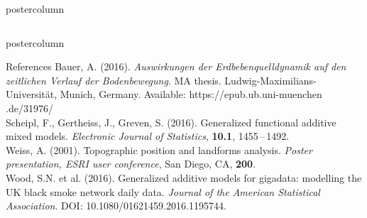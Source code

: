 \documentclass[final,hyperref={pdfpagelabels=false}]{beamer}
\begin{document}
\begin{frame}
\begin{columns}
\begin{column}{1\textwidth}
\begin{columns}[T]
\begin{column}{.484\textwidth}
\begin{beamercolorbox}[center,wd=\textwidth]{postercolumn}
\begin{minipage}[T]{.95\textwidth}
\end{minipage}
\end{beamercolorbox}
\end{column}

\begin{column}{.016\textwidth}
\end{column}

\end{columns}


\vspace{2ex}
\begin{beamercolorbox}[center,wd=\textwidth]{postercolumn}
\begin{minipage}[T]{.95\textwidth}  %
\begin{block}{\footnotesize References}
{\footnotesize %
Bauer, A. (2016). \textit{Auswirkungen der Erdbebenquelldynamik auf den zeitlich\-en Verlauf der Bodenbewegung}. MA thesis. Ludwig-Maximilians-Uni\-versi\-t\"{a}t, Munich, Germany. Available: https://epub.ub.uni-muenchen .de/31976/ \\
Scheipl, F., Gertheiss, J., Greven, S. (2016). Generalized functional additive mixed models. \textit{Electronic Journal of Statistics}, \textbf{10.1}, 1455\,--\,1492. \\
Weiss, A. (2001). Topographic position and landforms analysis. \textit{Poster presentation, ESRI user conference}, San Diego, CA, \textbf{200}. \\
Wood, S.N. et al. (2016). Generalized additive models for gigadata: modelling the UK black smoke network daily data. \textit{Journal of the American Statistical Association}. DOI: 10.1080/01621459.2016.1195744.
} %
\end{block}
\end{minipage}
\end{beamercolorbox}

\end{column} %
\end{columns}
\end{frame}
\end{document}
